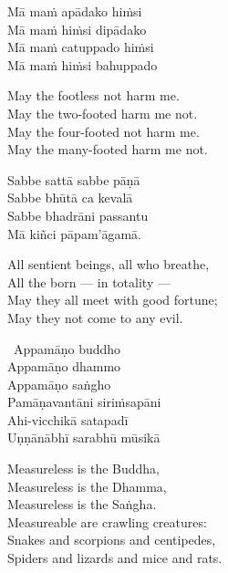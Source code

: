 \begin{pali-hang-continued}
  Mā maṁ apādako hiṁsi\\
  Mā maṁ hiṁsi dipādako\\
  Mā maṁ catuppado hiṁsi\\
  Mā maṁ hiṁsi bahuppado
\end{pali-hang-continued}

\begin{english-verses}
  May the footless not harm me.\\
  May the two-footed harm me not.\\
  May the four-footed not harm me.\\
  May the many-footed harm me not.
\end{english-verses}

\begin{pali-hang-continued}
  Sabbe sattā sabbe pāṇā\\
  Sabbe bhūtā ca kevalā\\
  Sabbe bhadrāni passantu\\
  Mā kiñci pāpam'āgamā.
\end{pali-hang-continued}

\begin{english-verses}
  All sentient beings, all who breathe,\\
  All the born — in totality —\\
  May they all meet with good fortune;\\
  May they not come to any evil.
\end{english-verses}

\begin{pali-hang-continued}
  \anglebracketleft\ \hspace{-0.5mm}Appamāṇo buddho \hspace{-0.5mm}\anglebracketright\ \\
  Appamāṇo dhammo\\
  Appamāṇo saṅgho\\
  Pamāṇavantāni siriṁsapāni\\
  Ahi-vicchikā satapadī\\
  Uṇṇānābhī sarabhū mūsikā
\end{pali-hang-continued}

\begin{english-verses}
  Measureless is the Buddha,\\
  Measureless is the Dhamma,\\
  Measureless is the Saṅgha.\\
  Measureable are crawling creatures:\\
  Snakes and scorpions and centipedes,\\
  Spiders and lizards and mice and rats.
\end{english-verses}

